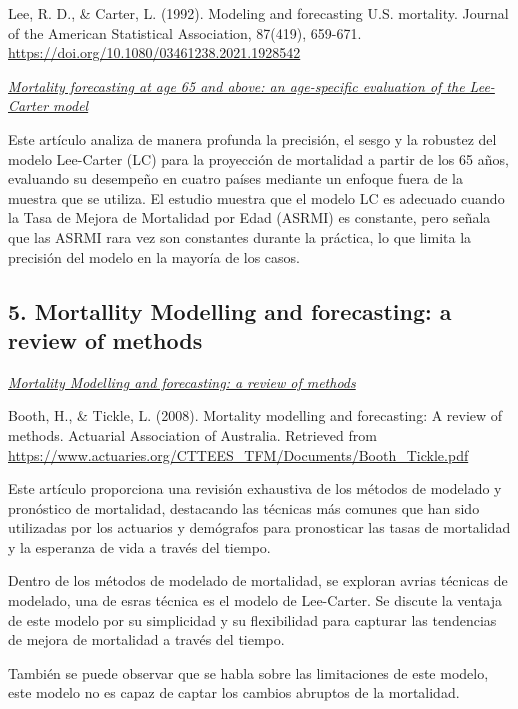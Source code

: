 \documentclass[
]{article}
\begin{document}
Lee, R. D., \& Carter, L. (1992). Modeling and forecasting U.S.
mortality. Journal of the American Statistical Association, 87(419),
659-671. \url{https://doi.org/10.1080/03461238.2021.1928542}

\href{https://www.tandfonline.com/doi/full/10.1080/03461238.2021.1928542\#d1e148}{\emph{Mortality
forecasting at age 65 and above: an age-specific evaluation of the
Lee-Carter model}}

Este artículo analiza de manera profunda la precisión, el sesgo y la
robustez del modelo Lee-Carter (LC) para la proyección de mortalidad a
partir de los 65 años, evaluando su desempeño en cuatro países mediante
un enfoque fuera de la muestra que se utiliza. El estudio muestra que el
modelo LC es adecuado cuando la Tasa de Mejora de Mortalidad por Edad
(ASRMI) es constante, pero señala que las ASRMI rara vez son constantes
durante la práctica, lo que limita la precisión del modelo en la mayoría
de los casos.

\hypertarget{mortallity-modelling-and-forecasting-a-review-of-methods}{%
\subsection{5. Mortallity Modelling and forecasting: a review of
methods}\label{mortallity-modelling-and-forecasting-a-review-of-methods}}

\href{https://www.actuaries.org/CTTEES_TFM/Documents/Booth_Tickle.pdf}{\emph{Mortality
Modelling and forecasting: a review of methods}}

Booth, H., \& Tickle, L. (2008). Mortality modelling and forecasting: A
review of methods. Actuarial Association of Australia. Retrieved from
\url{https://www.actuaries.org/CTTEES_TFM/Documents/Booth_Tickle.pdf}

Este artículo proporciona una revisión exhaustiva de los métodos de
modelado y pronóstico de mortalidad, destacando las técnicas más comunes
que han sido utilizadas por los actuarios y demógrafos para pronosticar
las tasas de mortalidad y la esperanza de vida a través del tiempo.

Dentro de los métodos de modelado de mortalidad, se exploran avrias
técnicas de modelado, una de esras técnica es el modelo de Lee-Carter.
Se discute la ventaja de este modelo por su simplicidad y su
flexibilidad para capturar las tendencias de mejora de mortalidad a
través del tiempo.

También se puede observar que se habla sobre las limitaciones de este
modelo, este modelo no es capaz de captar los cambios abruptos de la
mortalidad.
\end{document}
